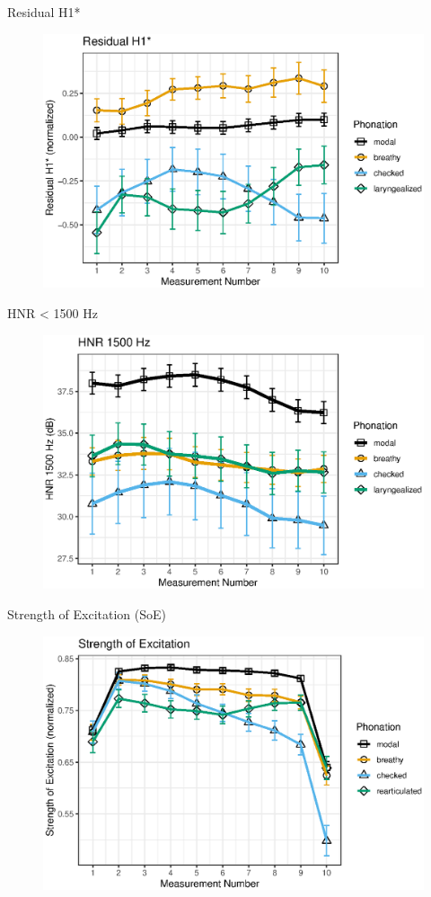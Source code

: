 \documentclass[professionalfont]{beamer}
\begin{document}
\begin{frame}{Residual H1*}
  \begin{figure}[h!]
    \centering
    \includegraphics[width = 0.8\linewidth]{images/slz_residual_h1c.eps}
  \end{figure}
\end{frame}

\begin{frame}{HNR < 1500 Hz}
  \begin{figure}[h!]
    \centering
    \includegraphics[width = 0.8\linewidth]{images/slz_hnr15.eps}
  \end{figure}
\end{frame}

\begin{frame}{Strength of Excitation (SoE)}
  \begin{figure}[h!]
    \centering
    \includegraphics[width = 0.8\linewidth]{images/slz_soe.eps}
  \end{figure}
\end{frame}
\end{document}
